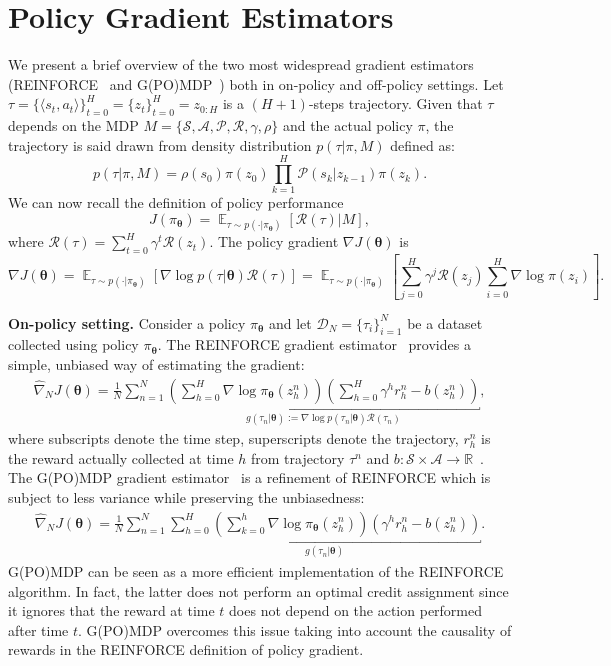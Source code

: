 \documentclass{article}
\makeatletter
\theoremstyle{remark}
\theoremstyle{definition}
\DeclareRobustCommand{\eg}{e.g.,\@\xspace}
\newcommand{\realspace}{\mathbb R}      %
\DeclareMathOperator*{\EV}{\mathbb{E}}
\newcommand{\EVV}[2][\ppvect \in \ppspace]{\EV_{#1}\left[{#2}\right]}
\newcommand{\vtheta}{\boldsymbol{\theta}}
\newcommand{\Reward}{\mathcal{R}}
\newcommand{\pol}{\pi_{\vtheta}}
\newcommand{\gradJ}[1]{\nabla J(#1)}
\newcommand{\gradApp}[2]{\widehat{\nabla}_{#2}J(#1)}
\makeatother
\begin{document}
\section{Policy Gradient Estimators} \label{A:gradient_estimators}
We present a brief overview of the two most widespread gradient estimators (REINFORCE~\citep{williams1992simple} and G(PO)MDP~\citep{baxter2001infinite}) both in on-policy and off-policy settings.
Let $\tau = \{\langle s_t,a_t \rangle\}_{t=0}^{H}= \{z_t\}_{t=0}^{H} = z_{0:H}$ is a $(H+1)$-steps trajectory.
Given that $\tau$ depends on the MDP $M=\{\mathcal{S},\mathcal{A}, \mathcal{P}, \Reward, \gamma, \rho\}$ and the actual policy $\pi$, the trajectory is
said drawn from density distribution $p(\tau|\pi,M)$ defined as:
\[
        p(\tau|\pi,M) = \rho(s_0) \pi(z_0) \prod_{k=1}^{H} \mathcal{P}(s_k|z_{k-1})\pi(z_k).
\]
We can now recall the definition of policy performance 
\[
        J(\pol) = \EVV[\tau \sim p(\cdot|\pol)]{\Reward(\tau)|M},
\]
where $\Reward(\tau) = \sum_{t=0}^{H}\gamma^t \Reward(z_t)$.
The policy gradient $\nabla J(\vtheta)$ is
\begin{equation}\label{E:onpolicygradient}
        \gradJ{\vtheta} = \EVV[\tau \sim p(\cdot|\pol)]{\nabla \log p(\tau|\vtheta)\Reward(\tau)} = \EVV[\tau \sim p(\cdot|\pol)]{\sum_{j=0}^{H} \gamma^j \mathcal{R}(z_j) \sum_{i=0}^{H} \nabla \log\pi(z_i)}.
\end{equation}

\textbf{On-policy setting.}
Consider a policy $\pol$ and let $\mathcal{D}_N = \{\tau_i\}_{i=1}^N$ be a dataset collected using policy $\pol$.
The REINFORCE gradient estimator~\citep{williams1992simple} provides a simple, unbiased way of estimating the gradient:
\begin{align*}
\gradApp{\vtheta}{N} = \frac{1}{N}\sum_{n=1}^{N}
\underbracket{
        \left(\sum_{h=0}^{H}\nabla \log \pol(z_h^n) \right)\left(\sum_{h=0}^{H}\gamma^h 
        r_h^n
- b(z_h^n)\right)
}_{g(\tau_n|\vtheta):=\nabla \log p(\tau_n|\vtheta)\Reward(\tau_n)}
,
\end{align*}
where subscripts denote the time step, superscripts denote the trajectory, $r_h^n$ is the reward actually collected at time $h$ from trajectory $\tau^n$ and $b : \mathcal{S}\times\mathcal{A} \to \realspace$~\citep[\eg][]{Thomas2017actionbaseline}.
The G(PO)MDP gradient estimator~\cite{baxter2001infinite} is a refinement of REINFORCE which is subject to less variance \cite{zhao2011analysis} while preserving the unbiasedness:
\begin{align*}
\gradApp{\vtheta}{N} = \frac{1}{N}\sum_{n=1}^{N}
\underbracket{
        \sum_{h=0}^{H}\left(\sum_{k=0}^{h} \nabla \log \pol (z_h^n) \right)\left(\gamma^h 
        r_h^n
        - b(z^n_h)\right)
}_{g(\tau_n|\vtheta)}.
\end{align*}
G(PO)MDP can be seen as a more efficient implementation of the REINFORCE algorithm. 
In fact, the latter does not perform an optimal credit assignment since it ignores that the reward at time $t$ does not depend on the action performed after time $t$.
G(PO)MDP overcomes this issue taking into account the causality of rewards in the REINFORCE definition of policy gradient.
\end{document}
